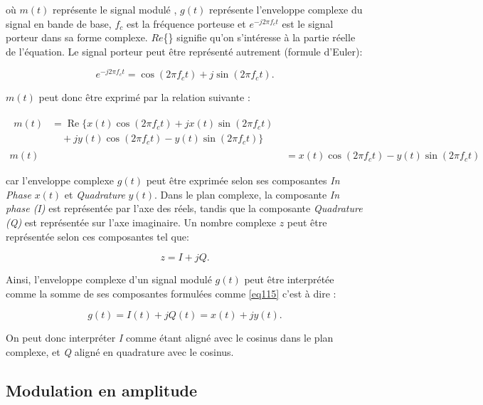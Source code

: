 où $m(t)$ représente le signal modulé , $g(t)$ représente l'enveloppe complexe du signal en bande de base, $f_c$ est la fréquence porteuse et $e^{-j2\pi f_c t}$ est le signal porteur dans sa forme complexe. $Re$\{\} signifie qu'on s'intéresse à la partie réelle de l'équation. Le signal porteur peut être représenté autrement (formule d'Euler):

\begin{equation}\label{eq111}
e^{-j2\pi f_c t} = \cos(2 \pi f_c t) + j \sin(2 \pi f_c t).
\end{equation}

$m(t)$ peut donc être exprimé par la relation suivante :

\begin{align}
    \begin{split}
    m(t) &= \operatorname{Re} \{ x(t) \cos(2 \pi f_c t) + j x(t) \sin(2 \pi f_c t) \\
         &\quad + j y(t) \cos(2 \pi f_c t) - y(t) \sin(2 \pi f_c t)\}
    \end{split} \\
    m(t) &= x(t) \cos(2 \pi f_c t) - y(t) \sin(2 \pi f_c t)
\end{align}

car l'enveloppe complexe $g(t)$ peut être exprimée selon ses composantes \textit{In Phase} $x(t)$ et \textit{Quadrature} $y(t)$. Dans le plan complexe, la composante \textit{In phase (I)} est représentée par l'axe des réels, tandis que la composante \textit{Quadrature (Q)} est représentée sur l'axe imaginaire. Un nombre complexe $z$ peut être représentée selon ces composantes tel que:

\begin{equation}\label{eq115}
z = I + jQ.
\end{equation}

Ainsi, l'enveloppe complexe d'un signal modulé $g(t)$ peut être interprétée comme la somme de ses composantes formulées comme \ref{eq115} c'est à dire :

\begin{equation}\label{eq116}
g(t) = I(t) + jQ(t) = x(t) + jy(t).
\end{equation}

On peut donc interpréter \textit{I} comme étant aligné avec le cosinus dans le plan complexe, et \textit{Q} aligné en quadrature avec le cosinus.

\subsection{Modulation en amplitude}

